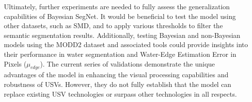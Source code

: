 Ultimately, further experiments are needed to fully assess the generalization capabilities of Bayesian SegNet. It 
would be beneficial to test the model using other datasets, such as SMD, and to apply various thresholds to filter 
the semantic segmentation results. Additionally, testing Bayesian and non-Bayesian models using the MODD2 dataset 
and associated tools could provide insights into their performance in water segmentation and Water-Edge Estimation 
Error in Pixels ($\mu_{edge}$). The current series of validations demonstrate the unique advantages of the model in 
enhancing the visual processing capabilities and robustness of USVs. However, they do not fully establish that the 
model can replace existing USV technologies or surpass other technologies in all respects.

